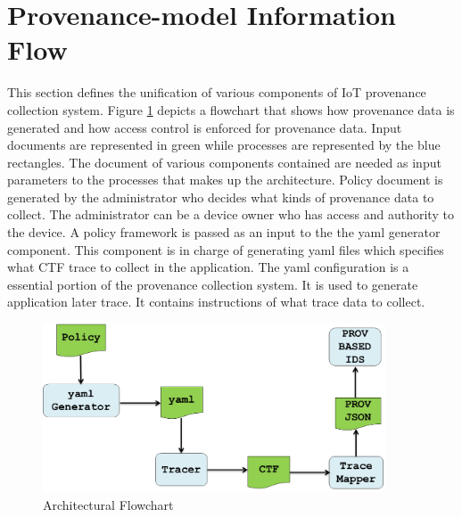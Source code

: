 \section{Provenance-model Information Flow}

This section defines the unification of various components of IoT provenance collection system. Figure \ref{flow_chart} depicts a flowchart that shows how provenance data is generated and how access control is enforced for provenance data. Input documents are represented in green while processes are represented by the blue rectangles. The  document of various components contained are needed as input parameters to the processes that makes up the architecture. Policy document is generated by the administrator who decides what kinds of provenance data to collect. The administrator can be a device owner who has access and authority to the device. A policy framework is passed as an input to the the yaml generator component. This component is in charge of generating yaml files which specifies what CTF trace to collect in the application. The yaml configuration is a essential portion of the provenance collection system.  It is used to generate application later trace. It contains instructions of what trace data to collect. 

\begin{figure}[h]
\begin{center}

\includegraphics[width =4.0in]{flow.PNG}    
\end{center}
\caption{Architectural Flowchart }
\label{flow_chart}
\end{figure}




%

